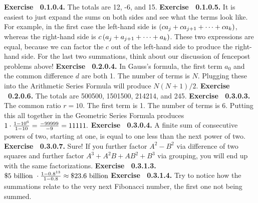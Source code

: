 \par 
 {\noindent \protect \bf  Exercise ~0.1.0.4.} The totals are 12, -6, and 15. \protect \newline  \protect \newline  
 {\noindent \protect \bf  Exercise ~0.1.0.5.} It is easiest to just expand the sums on both sides and see what the terms look like. For example, in the first case the left-hand side is $\left (ca_j+ca_{j+1}+\protect \cdots  +ca_k\right )$, whereas the right-hand side is $c\left (a_j+a_{j+1}+\protect \cdots  +a_k\right )$. These two expressions are equal, because we can factor the $c$ out of the left-hand side to produce the right-hand side. For the last two summations, think about our discussion of fencepost problems above! \protect \newline  \protect \newline  
 {\noindent \protect \bf  Exercise ~0.2.0.4.}  In Gauss's formula, the first term $a_0$ and the common difference $d$ are both 1. The number of terms is $N$. Plugging these into the Arithmetic Series Formula will produce $N(N+1)/2$. \protect \newline  \protect \newline  
 {\noindent \protect \bf  Exercise ~0.2.0.6.} The totals are 500500, 1501500, 214214, and 245. \protect \newline  \protect \newline  
 {\noindent \protect \bf  Exercise ~0.3.0.3.} The common ratio $r=10$. The first term is 1. The number of terms is 6. Putting this all together in the Geometric Series Formula produces $1\cdot \protect \frac  {1-10^6}{1-10}=\protect \frac  {-99999}{-9}=11111.$ \protect \newline  \protect \newline  
 {\noindent \protect \bf  Exercise ~0.3.0.4.} A finite sum of consecutive powers of two, starting at one, is equal to one less than the next power of two. \protect \newline  \protect \newline  
 {\noindent \protect \bf  Exercise ~0.3.0.7.} Sure! If you further factor $A^2-B^2$ via difference of two squares and further factor $A^3+A^2B+AB^2+B^3$ via grouping, you will end up with the same factorizations. \protect \newline  \protect \newline  
 {\noindent \protect \bf  Exercise ~0.3.1.3.} $\protect \$5 \protect \text  { billion }\cdot \protect \frac  {1-0.8^{13}}{1-0.8}\approx \protect \$23.6 \protect \text  { billion}$ \protect \newline  \protect \newline  
 {\noindent \protect \bf  Exercise ~0.3.1.4.} Try to notice how the summations relate to the very next Fibonacci number, the first one not being summed. \protect \newline  \protect \newline  
